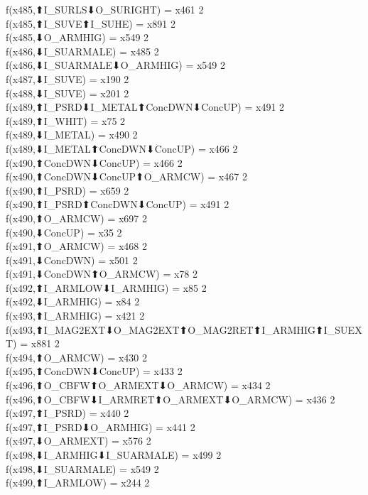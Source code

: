 f(x485,⬆I_SURLS⬇O_SURIGHT) = x461 {2} \\
f(x485,⬆I_SUVE⬆I_SUHE) = x891 {2} \\
f(x485,⬇O_ARMHIG) = x549 {2} \\
f(x486,⬇I_SUARMALE) = x485 {2} \\
f(x486,⬇I_SUARMALE⬇O_ARMHIG) = x549 {2} \\
f(x487,⬇I_SUVE) = x190 {2} \\
f(x488,⬇I_SUVE) = x201 {2} \\
f(x489,⬆I_PSRD⬇I_METAL⬆ConcDWN⬇ConcUP) = x491 {2} \\
f(x489,⬆I_WHIT) = x75 {2} \\
f(x489,⬇I_METAL) = x490 {2} \\
f(x489,⬇I_METAL⬆ConcDWN⬇ConcUP) = x466 {2} \\
f(x490,⬆ConcDWN⬇ConcUP) = x466 {2} \\
f(x490,⬆ConcDWN⬇ConcUP⬆O_ARMCW) = x467 {2} \\
f(x490,⬆I_PSRD) = x659 {2} \\
f(x490,⬆I_PSRD⬆ConcDWN⬇ConcUP) = x491 {2} \\
f(x490,⬆O_ARMCW) = x697 {2} \\
f(x490,⬇ConcUP) = x35 {2} \\
f(x491,⬆O_ARMCW) = x468 {2} \\
f(x491,⬇ConcDWN) = x501 {2} \\
f(x491,⬇ConcDWN⬆O_ARMCW) = x78 {2} \\
f(x492,⬆I_ARMLOW⬇I_ARMHIG) = x85 {2} \\
f(x492,⬇I_ARMHIG) = x84 {2} \\
f(x493,⬆I_ARMHIG) = x421 {2} \\
f(x493,⬆I_MAG2EXT⬇O_MAG2EXT⬆O_MAG2RET⬆I_ARMHIG⬆I_SUEXT) = x881 {2} \\
f(x494,⬆O_ARMCW) = x430 {2} \\
f(x495,⬆ConcDWN⬇ConcUP) = x433 {2} \\
f(x496,⬆O_CBFW⬆O_ARMEXT⬇O_ARMCW) = x434 {2} \\
f(x496,⬆O_CBFW⬇I_ARMRET⬆O_ARMEXT⬇O_ARMCW) = x436 {2} \\
f(x497,⬆I_PSRD) = x440 {2} \\
f(x497,⬆I_PSRD⬇O_ARMHIG) = x441 {2} \\
f(x497,⬇O_ARMEXT) = x576 {2} \\
f(x498,⬇I_ARMHIG⬇I_SUARMALE) = x499 {2} \\
f(x498,⬇I_SUARMALE) = x549 {2} \\
f(x499,⬆I_ARMLOW) = x244 {2} \\
